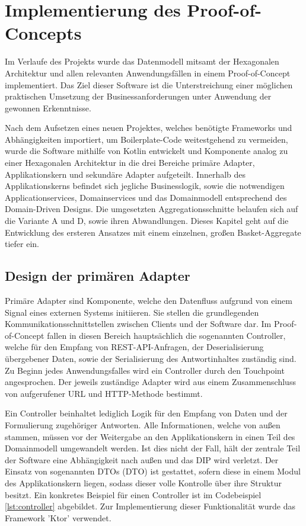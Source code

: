 \chapter{Implementierung des Proof-of-Concepts}

Im Verlaufe des Projekts wurde das Datenmodell mitsamt der Hexagonalen Architektur und allen relevanten Anwendungsfällen in einem Proof-of-Concept implementiert. Das Ziel dieser Software ist die Unterstreichung einer möglichen praktischen Umsetzung der Businessanforderungen unter Anwendung der gewonnen Erkenntnisse. 

Nach dem Aufsetzen eines neuen Projektes, welches benötigte Frameworks und Abhängigkeiten importiert, um \gls{Boilerplate}-Code weitestgehend zu vermeiden, wurde die Software mithilfe von Kotlin entwickelt und Komponente analog zu einer Hexagonalen Architektur in die drei Bereiche primäre Adapter, Applikationskern und sekundäre Adapter aufgeteilt. Innerhalb des Applikationskerns befindet sich jegliche Businesslogik, sowie die notwendigen Applicationservices, Domainservices und das Domainmodell entsprechend des Domain-Driven Designs. Die umgesetzten Aggregationsschnitte belaufen sich auf die Variante A und D, sowie ihren Abwandlungen. Dieses Kapitel geht auf die Entwicklung des ersteren Ansatzes mit einem einzelnen, großen Basket-Aggregate tiefer ein.


\section{Design der primären Adapter}

Primäre Adapter sind Komponente, welche den Datenfluss aufgrund von einem Signal eines externen Systems initiieren. Sie stellen die grundlegenden Kommunikationsschnittstellen zwischen Clients und der Software dar. Im Proof-of-Concept fallen in diesen Bereich hauptsächlich die sogenannten Controller, welche für den Empfang von REST-API-Anfragen, der Deserialisierung übergebener Daten, sowie der Serialisierung des Antwortinhaltes zuständig sind. Zu Beginn jedes Anwendungsfalles wird ein Controller durch den Touchpoint angesprochen. Der jeweils zuständige Adapter wird aus einem Zusammenschluss von aufgerufener URL und HTTP-Methode bestimmt. 

Ein Controller beinhaltet lediglich Logik für den Empfang von Daten und der Formulierung zugehöriger Antworten. Alle Informationen, welche von außen stammen, müssen vor der Weitergabe an den Applikationskern in einen Teil des Domainmodell umgewandelt werden. Ist dies nicht der Fall, hält der zentrale Teil der Software eine Abhängigkeit nach außen und das \acrlong{DIP} wird verletzt. Der Einsatz von sogenannten \acrlong{DTO}s (\acrshort{DTO}) ist gestattet, sofern diese in einem Modul des Applikationskern liegen, sodass dieser volle Kontrolle über ihre Struktur besitzt. Ein konkretes Beispiel für einen Controller ist im Codebeispiel \ref{lst:controller} abgebildet. Zur Implementierung dieser Funktionalität wurde das Framework 'Ktor' verwendet.

